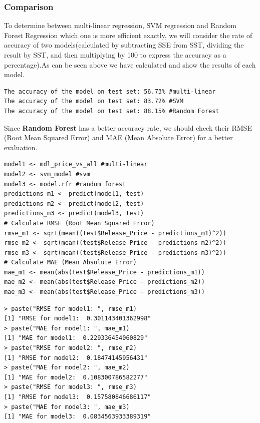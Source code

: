 \documentclass[a4paper]{article}
\theoremstyle{definition}
\begin{document}
\subsubsection{Comparison}
To determine between multi-linear regression, SVM regression and Random Forest Regression which one is more efficient exactly, we will consider the rate of accuracy of two models(calculated by subtracting SSE from SST, dividing the result by SST, and then multiplying by 100 to express the accuracy as a percentage).As can be seen above we have calculated and show the results of each model.\\
\begin{mdframed}[leftline=false,rightline=false,backgroundcolor=lightblue!10,nobreak=false]
    \begin{verbatim}
The accuracy of the model on test set: 56.73% #multi-linear
The accuracy of the model on test set: 83.72% #SVM 
The accuracy of the model on test set: 88.15% #Random Forest
\end{verbatim}
\end{mdframed}
Since \textbf{Random Forest} has a better accuracy rate, we should check their RMSE (Root Mean Squared Error) and MAE (Mean Absolute Error) for a better evaluation.
\begin{mdframed}[leftline=false,rightline=false,backgroundcolor=lightblue!10,nobreak=false]
    \begin{verbatim}
model1 <- mdl_price_vs_all #multi-linear 
model2 <- svm_model #svm
model3 <- model.rfr #random forest
predictions_m1 <- predict(model1, test)
predictions_m2 <- predict(model2, test)
predictions_m3 <- predict(model3, test)
# Calculate RMSE (Root Mean Squared Error)
rmse_m1 <- sqrt(mean((test$Release_Price - predictions_m1)^2))
rmse_m2 <- sqrt(mean((test$Release_Price - predictions_m2)^2))
rmse_m3 <- sqrt(mean((test$Release_Price - predictions_m3)^2))
# Calculate MAE (Mean Absolute Error)
mae_m1 <- mean(abs(test$Release_Price - predictions_m1))
mae_m2 <- mean(abs(test$Release_Price - predictions_m2))
mae_m3 <- mean(abs(test$Release_Price - predictions_m3))
\end{verbatim}
\end{mdframed}
\begin{mdframed}[leftline=false,rightline=false,backgroundcolor=lightblue!10,nobreak=false]
    \begin{verbatim}
> paste("RMSE for model1: ", rmse_m1)
[1] "RMSE for model1:  0.301143401362998"
> paste("MAE for model1: ", mae_m1)
[1] "MAE for model1:  0.229336454060829"
> paste("RMSE for model2: ", rmse_m2)
[1] "RMSE for model2:  0.18474145956431"
> paste("MAE for model2: ", mae_m2)
[1] "MAE for model2:  0.108300786582277"
> paste("RMSE for model3: ", rmse_m3)
[1] "RMSE for model3:  0.157580846686117"
> paste("MAE for model3: ", mae_m3)
[1] "MAE for model3:  0.0834563933389319"
\end{verbatim}
\end{mdframed}
\end{document}
